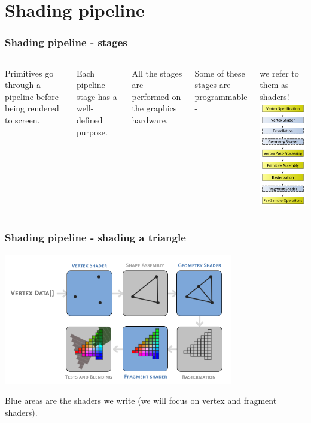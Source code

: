 \documentclass{beamer}
\begin{document}
%
%
%
\section{Shading pipeline}

\begin{frame}
\frametitle{Shading pipeline - stages}
\begin{columns}
Primitives go through a pipeline before being rendered to screen.

\vspace{3mm}
Each pipeline stage has a well-defined purpose.

\vspace{3mm}
All the stages are performed on the graphics hardware.

\vspace{3mm}
Some of these stages are programmable -

\vspace{1mm}
we refer to them as shaders!
\includegraphics[width=36mm]{images/RenderingPipeline.png}
\end{columns}
\end{frame}

\begin{frame}
\frametitle{Shading pipeline - shading a triangle}
\includegraphics[width=10cm]{images/pipeline.png}

Blue areas are the shaders we write
(we will focus on vertex and fragment shaders).
\end{frame}
\end{document}
